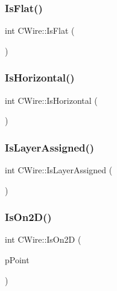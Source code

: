 \mbox{\label{classCWire_a94140b0fd930f03e8a4a5a2988469987}} 
\subsubsection{\texorpdfstring{IsFlat()}{IsFlat()}}
{\footnotesize\ttfamily int C\+Wire\+::\+Is\+Flat (\begin{DoxyParamCaption}{ }\end{DoxyParamCaption})}

\mbox{\label{classCWire_a24f10d80a124f5929fcca8fb026c718d}} 
\subsubsection{\texorpdfstring{IsHorizontal()}{IsHorizontal()}}
{\footnotesize\ttfamily int C\+Wire\+::\+Is\+Horizontal (\begin{DoxyParamCaption}{ }\end{DoxyParamCaption})}

\mbox{\label{classCWire_a58444c1e0db9838445654d85a3405741}} 
\subsubsection{\texorpdfstring{IsLayerAssigned()}{IsLayerAssigned()}}
{\footnotesize\ttfamily int C\+Wire\+::\+Is\+Layer\+Assigned (\begin{DoxyParamCaption}{ }\end{DoxyParamCaption})}

\mbox{\label{classCWire_aa0addc021fd850f888ec7c703ffe91d7}} 
\subsubsection{\texorpdfstring{IsOn2D()}{IsOn2D()}}
{\footnotesize\ttfamily int C\+Wire\+::\+Is\+On2D (\begin{DoxyParamCaption}\item[{\mbox{\hyperlink{classCPoint}{C\+Point}} $\ast$}]{p\+Point }\end{DoxyParamCaption})}

